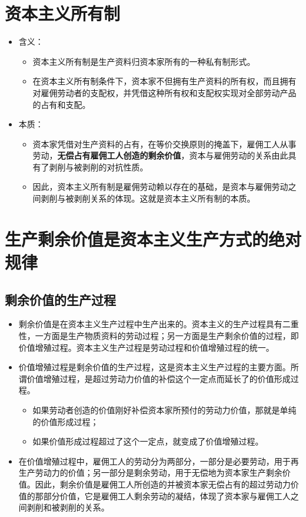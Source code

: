 \documentclass[12pt,openany]{ctexbook}
\newcommand{\zhemph}[1]{{\kaishu #1}}
\begin{document}
\section{资本主义所有制}
\begin{itemize}
  \item 含义：
\begin{itemize}
  \item 资本主义所有制是生产资料归资本家所有的一种私有制形式。
  \item 在资本主义所有制条件下，资本家不但拥有生产资料的所有权，而且拥有对雇佣劳动者的支配权，并凭借这种所有权和支配权实现对全部劳动产品的占有和支配。
\end{itemize}
  \item 本质：
\begin{itemize}
  \item 资本家凭借对生产资料的占有，在\zhemph{等价交换原则的掩盖下}，雇佣工人从事劳动，\textbf{无偿占有雇佣工人创造的剩余价值}，资本与雇佣劳动的关系由此具有了剥削与被剥削的对抗性质。
  \item 因此，资本主义所有制是雇佣劳动赖以存在的基础，是资本与雇佣劳动之间剥削与被剥削关系的体现。这就是资本主义所有制的本质。
\end{itemize}
\end{itemize}
\section{生产剩余价值是资本主义生产方式的绝对规律}
\subsection{剩余价值的生产过程}
\begin{itemize}
  \item 剩余价值是在资本主义生产过程中生产出来的。资本主义的生产过程具有二重性，一方面是生产物质资料的劳动过程；另一方面是生产剩余价值的过程，即价值增殖过程。资本主义生产过程是劳动过程和价值增殖过程的统一。
  \item 价值增殖过程是剩余价值的生产过程，这是资本主义生产过程的主要方面。所谓价值增殖过程，是超过劳动力价值的补偿这个一定点而延长了的价值形成过程。
\begin{itemize}
  \item 如果劳动者创造的价值刚好补偿资本家所预付的劳动力价值，那就是单纯的价值形成过程；
  \item 如果价值形成过程超过了这个一定点，就变成了价值增殖过程。
\end{itemize}
  \item 在价值增殖过程中，雇佣工人的劳动分为两部分，一部分是必要劳动，用于再生产劳动力的价值；另一部分是剩余劳动，用于无偿地为资本家生产剩余价值。因此，剩余价值是雇佣工人所创造的并被资本家无偿占有的超过劳动力价值的那部分价值，它是雇佣工人剩余劳动的凝结，体现了资本家与雇佣工人之间剥削和被剥削的关系。
\end{itemize}
\end{document}
